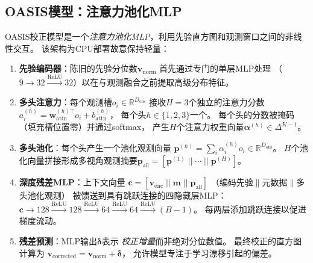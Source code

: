 \documentclass[runningheads]{llncs}
\begin{document}
\subsection{OASIS模型：注意力池化MLP}
\label{sec:mlp}

OASIS校正模型是一个\emph{注意力池化MLP}，利用先验直方图和观测窗口之间的非线性交互。
该架构为CPU部署故意保持轻量：

\begin{enumerate}
  \item \textbf{先验编码器}：陈旧的先验分位数$\mathbf{v}_{\text{norm}}$
        首先通过专门的单层MLP处理
        （$9 \to 32 \xrightarrow{\text{ReLU}} 32$）以在与观测融合之前提取高级分布特征。
  \item \textbf{多头注意力}：每个观测槽$o_i \in \mathbb{R}^{D_{\text{obs}}}$
        接收$H{=}3$个独立的注意力分数
        $a_i^{(h)} = \mathbf{w}_{\text{attn}}^{(h)\top} o_i + b_{\text{attn}}^{(h)}$，
        每个头$h \in \{1,2,3\}$一个。
        每个头的分数被掩码（填充槽位置零）并通过softmax，
        产生$H$个注意力权重向量$\boldsymbol{\alpha}^{(h)} \in \Delta^{K-1}$。
  \item \textbf{多头池化}：每个头产生一个池化观测向量
        $\mathbf{p}^{(h)} = \sum_{i} \alpha_i^{(h)} o_i \in \mathbb{R}^{D_{\text{obs}}}$。
        $H$个池化向量拼接形成多视角观测摘要$\mathbf{p}_{\text{all}} = [\mathbf{p}^{(1)} \;||\; \cdots \;||\; \mathbf{p}^{(H)}]$。
  \item \textbf{深度残差MLP}：上下文向量
        $\mathbf{c} = [\mathbf{v}_{\text{enc}} \;||\; \mathbf{m} \;||\; \mathbf{p}_{\text{all}}]$
        （编码先验$\|$元数据$\|$多头池化观测）
        被馈送到具有跳跃连接的四隐藏层MLP：
        $\mathbf{c} \to 128 \xrightarrow{\text{ReLU}} 128 \xrightarrow{\text{ReLU}} 64 \xrightarrow{\text{ReLU}} 64 \xrightarrow{\text{ReLU}} (B{-}1)$。
        每两层添加跳跃连接以促进梯度流动。
  \item \textbf{残差预测}：MLP输出$\boldsymbol{\delta}$表示
        \emph{校正增量}而非绝对分位数值。
        最终校正的直方图计算为
        $\mathbf{v}_{\text{corrected}} = \mathbf{v}_{\text{norm}} + \boldsymbol{\delta}$，
        允许模型专注于学习漂移引起的偏差。
\end{enumerate}
\end{document}

